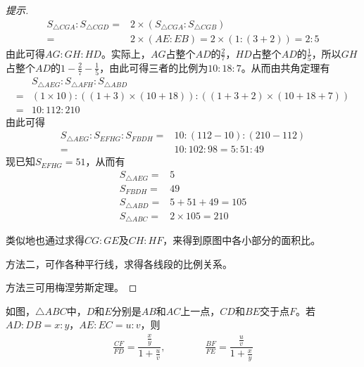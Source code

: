 \begin{proof}[提示]
  \begin{align*}
    S_{\triangle CGA}:S_{\triangle CGD} ={}& 2\times( S_{\triangle CGA}:S_{\triangle CGB} )\\
    ={}& 2\times( AE:EB ) = 2\times( 1 : (3+2))=2:5
  \end{align*}
  由此可得$AG:GH:HD$。实际上，$AG$占整个$AD$的$\frac27$，$HD$占整个$AD$的$\frac15$，所以$GH$占整个$AD$的$1-\frac27-\frac15$，由此可得三者的比例为$10:18:7$。从而由共角定理有
  \begin{align*}
    &S_{\triangle AEG} : S_{\triangle AFH} : S_{\triangle ABD}\\
    =&(1\times 10) : ((1+3)\times(10+18)) : ((1+3+2)\times(10+18+7))\\
    =&10 : 112 : 210
  \end{align*}
  由此可得
  \begin{align*}
    S_{\triangle AEG} : S_{EFHG} : S_{FBDH} ={}& 10 : (112-10) : (210-112)\\
    ={}& 10:102:98=5:51:49
  \end{align*}
  现已知$S_{EFHG}=51$，从而有
  \begin{align*}
    S_{\triangle AEG}={}&5\\
    S_{FBDH}         ={}&49\\
    S_{\triangle ABD}={}&5+51+49=105\\
    S_{\triangle ABC}={}&2\times 105=210
  \end{align*}

  类似地也通过求得$CG:GE$及$CH:HF$，来得到原图中各小部分的面积比。

  方法二，可作各种平行线，求得各线段的比例关系。

  方法三可用梅涅劳斯定理。
\end{proof}

\begin{theorem}
  如图，$\triangle ABC$中，$D$和$E$分别是$AB$和$AC$上一点，$CD$和$BE$交于点$F$。若$AD:DB=x:y$，$AE:EC=u:v$，则
  \begin{align*}
    \frac{CF}{FD} = \dfrac{\frac{x}{y}}{1+\frac{u}{v}},\qquad\qquad
    \frac{BF}{FE} = \dfrac{\frac{u}{v}}{1+\frac{x}{y}}
  \end{align*}
  \begin{center}
  \end{center}
\end{theorem}

